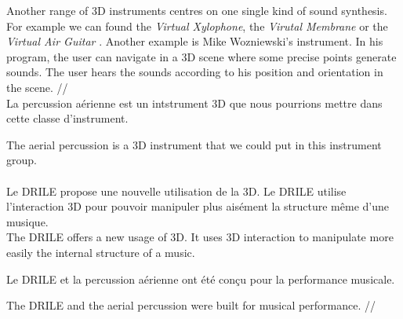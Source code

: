 Another range of 3D instruments centres on one single kind of sound synthesis. For example we can found the \textit{Virtual Xylophone}, the \textit{Virutal Membrane} or the \textit{Virtual Air Guitar} \cite{maki2005}. Another example is Mike Wozniewski's \cite{wozniewski2006spatial} instrument. In his program, the user can navigate in a 3D scene where some precise points generate sounds. The user hears the sounds according to his position and orientation in the scene.
//
\\
La percussion aérienne est un intstrument 3D que nous pourrions mettre dans cette classe d'instrument.

The aerial percussion is a 3D instrument that we could put in this instrument group.

\paragraph{}
Le DRILE propose une nouvelle utilisation de la 3D. Le DRILE utilise l'interaction 3D pour pouvoir manipuler plus aisément la structure même d'une musique.
\\
The DRILE offers a new usage of 3D. It uses 3D interaction to manipulate more easily the internal structure of a music.

Le DRILE et la percussion aérienne ont été conçu pour la performance musicale.

The DRILE and the aerial percussion were built for musical performance.
//
